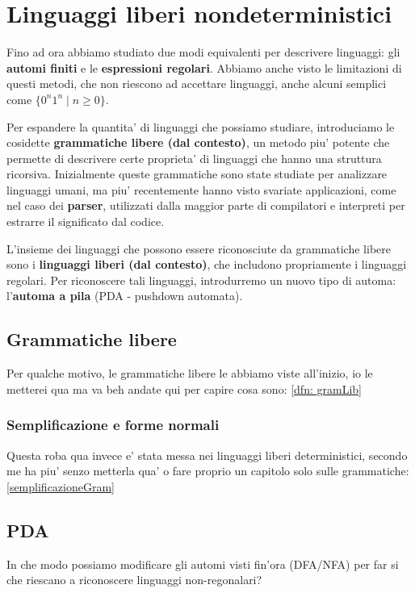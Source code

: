\chapter{Linguaggi liberi nondeterministici}
Fino ad ora abbiamo studiato due modi equivalenti per descrivere linguaggi: gli \textbf{automi finiti} e le \textbf{espressioni regolari}. Abbiamo anche visto le limitazioni di questi metodi, che non riescono ad accettare linguaggi, anche alcuni semplici come $ \{0^n 1^n \mid n \geq 0\} $. 

Per espandere la quantita' di linguaggi che possiamo studiare, introduciamo le cosidette \textbf{grammatiche libere (dal contesto)}, un metodo piu' potente che permette di descrivere certe proprieta' di linguaggi che hanno una struttura ricorsiva. Inizialmente queste grammatiche sono state studiate per analizzare linguaggi umani, ma piu' recentemente hanno visto svariate applicazioni, come nel caso dei \textbf{parser}, utilizzati dalla maggior parte di compilatori e interpreti per estrarre il significato dal codice. 

L'insieme dei linguaggi che possono essere riconosciute da grammatiche libere sono i \textbf{linguaggi liberi (dal contesto)}, che includono propriamente i linguaggi regolari. Per riconoscere tali linguaggi, introdurremo un nuovo tipo di automa: l'\textbf{automa a pila} (PDA - pushdown automata).

\section{Grammatiche libere}
Per qualche motivo, le grammatiche libere le abbiamo viste all'inizio, io le metterei qua ma va beh andate qui per capire cosa sono: \ref{dfn: gramLib}

\subsection{Semplificazione e forme normali}
Questa roba qua invece e' stata messa nei linguaggi liberi deterministici, secondo me ha piu' senzo metterla qua' o fare proprio un capitolo solo sulle grammatiche: \ref{semplificazioneGram}

\section{PDA}
In che modo possiamo modificare gli automi visti fin'ora (DFA/NFA) per far si che riescano a riconoscere linguaggi non-regonalari?

